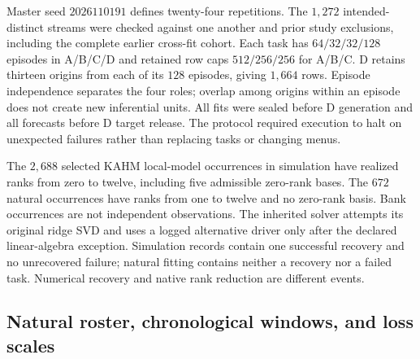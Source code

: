 Master seed $2026110191$ defines twenty-four repetitions. The $1,272$
intended-distinct streams were checked against one another and prior
study exclusions, including the complete earlier cross-fit cohort.
Each task has $64/32/32/128$ episodes in A/B/C/D and retained row caps
$512/256/256$ for A/B/C. D retains thirteen origins from each of its
$128$ episodes, giving $1,664$ rows. Episode independence separates
the four roles; overlap among origins within an episode does not create
new inferential units. All fits were sealed before D generation and
all forecasts before D target release. The protocol required execution to halt on unexpected failures rather
than replacing tasks or changing menus.

\begin{table}[t]
\centering\small
\caption{Simulation law/noise summaries. Every condition is retained;
these means and C-selection frequencies are descriptive, with no
additional superiority test or selection of a favorable target population.}
\label{supp:pa-conditions}

\end{table}

\begin{table}[t]
\centering\small
\caption{B-selected requested caps and transformations. Counts refer to
candidate fits, including tasks on which C ultimately rejects KAHM.
They neither rank transformations using D nor identify a universal
preferred dimension.}
\label{supp:pa-selections}

\end{table}

The $2,688$ selected KAHM local-model occurrences in simulation have
realized ranks from zero to twelve, including five admissible zero-rank
bases. The $672$ natural occurrences have ranks from one to twelve and
no zero-rank basis. Bank occurrences are not independent observations.
The inherited solver attempts its original ridge SVD and uses a logged
alternative driver only after the declared linear-algebra exception.
Simulation records contain one successful recovery and no unrecovered
failure; natural fitting contains neither a recovery nor a failed task.
Numerical recovery and native rank reduction are different events.

\subsection{Natural roster, chronological windows, and loss scales}

